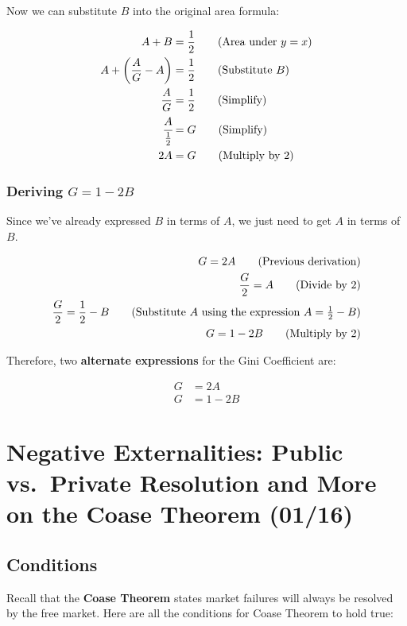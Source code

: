 \documentclass[
  letterpaper,
  DIV=11,
  numbers=noendperiod]{scrartcl}
\begin{document}
\newpage{}

Now we can substitute \(B\) into the original area formula:

\begin{align}
A + B &= \frac{1}{2}\tag{Area under $y=x$} \\
A+\left(\frac{A}{G}-A\right) &= \frac{1}{2}\tag{Substitute $B$} \\
\frac{A}{G} &= \frac{1}{2}\tag{Simplify} \\
\cfrac{A}{\frac{1}{2}} &= G\tag{Simplify} \\
2A &= G\tag{Multiply by 2}
\end{align}

\subsubsection{\texorpdfstring{Deriving
\(G=1-2B\)}{Deriving G=1-2B}}\label{deriving-g1-2b}

Since we've already expressed \(B\) in terms of \(A\), we just need to
get \(A\) in terms of \(B\).

\begin{align}
G = 2A \tag{Previous derivation} \\
\frac{G}{2} = A \tag{Divide by 2} \\
\frac{G}{2} = \frac{1}{2}-B\tag{Substitute $A$ using the expression $A=\frac{1}{2}-B$} \\
G = 1-2B\tag{Multiply by 2}
\end{align}

Therefore, two \textbf{alternate expressions} for the Gini Coefficient
are:

\begin{align}
G &= 2A \\
G &= 1-2B
\end{align}

\newpage{}

\section{Negative Externalities: Public vs.~Private Resolution and More
on the Coase Theorem
(01/16)}\label{negative-externalities-public-vs.-private-resolution-and-more-on-the-coase-theorem-0116}

\subsection{Conditions}\label{conditions}

Recall that the \textbf{Coase Theorem} states market failures will
always be resolved by the free market. Here are all the conditions for
Coase Theorem to hold true:
\end{document}
